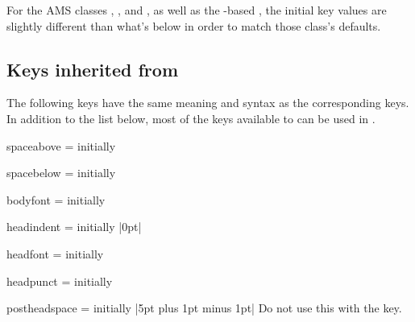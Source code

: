 \documentclass{ltxdoc}
\newcommand{\ttbraces}[1]{\braces{\texttt{#1}}}
\begin{document}
\begin{notebox}
For the AMS classes , , and , as well as the -based , the initial key values are slightly different than what's below in order to match those class's defaults.
\end{notebox}

\subsection{Keys inherited from }

The following keys have the same meaning and syntax as the corresponding  keys. In addition to the list below, most of the keys available to  can be used in .

\begin{docKey}{spaceabove}
  {=}
  {initially }

\end{docKey}

\begin{docKey}{spacebelow}
  {=}
  {initially }

\end{docKey}

\begin{docKey}{bodyfont}
  {=}
  {initially }

\end{docKey}

\begin{docKey}{headindent}
  {=}
  {initially |0pt|}

\end{docKey}

\begin{docKey}{headfont}
  {=}
  {initially }

\end{docKey}

\begin{docKey}{headpunct}
  {=}
  {initially \ttbraces{.}}

\end{docKey}

\begin{docKey}{postheadspace}
  {=}
  {initially |5pt plus 1pt minus 1pt|}
Do not use this with the  key.
\end{docKey}
\end{document}

